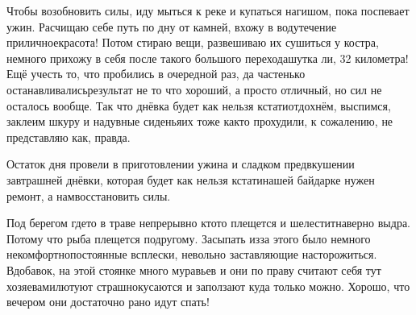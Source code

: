 Чтобы возобновить силы, иду мыться к реке и купаться нагишом, пока поспевает ужин. Расчищаю себе путь по дну от камней, вхожу в воду\mdash течение приличное\mdash красота! Потом стираю вещи, развешиваю их сушиться у костра, немного прихожу в себя после такого большого перехода\mdash шутка ли, 32 километра! Ещё учесть то, что пробились в очередной раз, да частенько останавливались\mdash результат не то что хороший, а просто отличный, но сил не осталось вообще. Так что днёвка будет как нельзя кстати\mdash отдохнём, выспимся, заклеим шкуру и надувные сиденья\mdash их тоже как\sdash то прохудили, к сожалению, не представляю как, правда.

Остаток дня провели в приготовлении ужина и сладком предвкушении завтрашней днёвки, которая будет как нельзя кстати\mdash нашей байдарке нужен ремонт, а нам\mdash восстановить силы. 

Под берегом где\sdash то в траве непрерывно кто\sdash то плещется и шелестит\mdash наверно выдра. Потому что рыба плещется по\sdash другому. Засыпать из\sdash за этого было немного некомфортно\mdash постоянные всплески, невольно заставляющие насторожиться. Вдобавок, на этой стоянке много муравьев и они по праву считают себя тут хозяевами\mdash лютуют страшно\mdash кусаются и заползают куда только можно. Хорошо, что вечером они достаточно рано идут спать!

\begin{center}
\end{center}